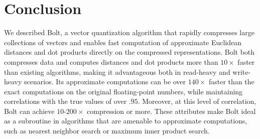 \documentclass[sigconf]{acmart}  %
\begin{document}
\section{Conclusion} \label{sec:conclusion}



We described Bolt, a vector quantization algorithm that rapidly compresses large collections of vectors and enables fast computation of approximate Euclidean distances and dot products directly on the compressed representations. Bolt both compresses data and computes distances and dot products more than $10\times$ faster than existing algorithms, making it advantageous both in read-heavy and write-heavy scenarios. Its approximate computations can be over $140\times$ faster than the exact computations on the original floating-point numbers, while maintaining correlations with the true values of over $.95$. Moreover, at this level of correlation, Bolt can achieve $10$-$200\times$ compression or more. These attributes make Bolt ideal as a subroutine in algorithms that are amenable to approximate computations, such as nearest neighbor search or maximum inner product search. %
\end{document}
